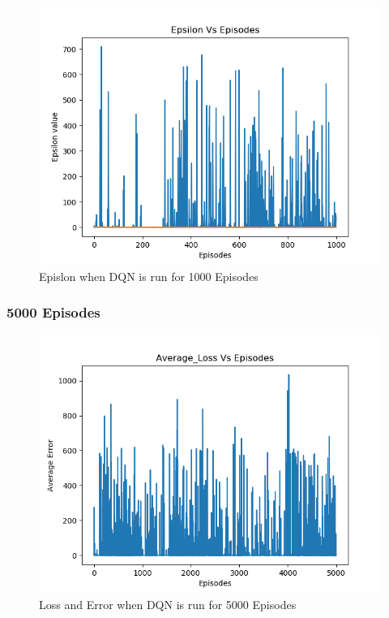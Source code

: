 \documentclass[doc, onecolumn, 12pt]{apa6}
\begin{document}
\begin{figure}

\includegraphics[width =\textwidth, height=0.4 \textheight]{results/dqn/1000_ep/Epsilon.png}
\caption{Epislon when DQN is run for 1000 Episodes}
\label{DQN_1000Ep_Epsilon}
\end{figure}

\FloatBarrier 
\subsubsection{5000 Episodes}
\begin{figure}
\label{DQN_5000Ep_Error}
\includegraphics[width =\textwidth, height=0.4 \textheight]{results/dqn/5000_ep/Error.png}
\caption{Loss and Error when DQN is run for 5000 Episodes}
\end{figure}
\end{document}
